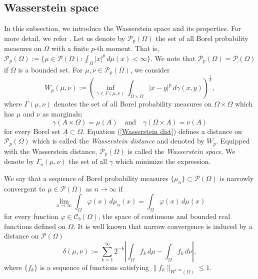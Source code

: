 \documentclass{amsart}
\numberwithin{equation}{section}
\newcommand{\calC}{{ \mathcal C  }}
\begin{document}
\subsection{Wasserstein space}\label{SS:Wasserstein}
In this subsection, we introduce the Wasserstein space and its properties. For more detail, we refer \cite{ags:book, Santambrosio15, V}.
 Let us denote by $\mathcal{P}_p (\Omega)$ the set of all Borel probability measures on $\Omega$ with a finite $p$-th moment. That is,
 $\mathcal{P}_p (\Omega):= \{\mu \in \mathcal{P} (\Omega) : \int_\Omega |x|^p \,d \mu(x) < \infty \}$.
 We note that $\mathcal{P}_p (\Omega)=\mathcal{P} (\Omega)$ if $\Omega$ is a bounded set.
For $\mu,\nu\in\mathcal{P}_p (\Omega)$, we consider
\begin{equation}\label{Wasserstein dist}
W_p(\mu,\nu):=\left(\inf_{\gamma\in\Gamma(\mu,\nu)}\int_{\Omega\times \Omega}|x-y|^p\, d\gamma(x,y)\right)^{\frac{1}{p}},
\end{equation}
where $\Gamma(\mu,\nu)$ denotes the set of all Borel probability measures on $\Omega\times \Omega$ which has $\mu$ and
$\nu$ as marginals;
$$\gamma(A\times \Omega)= \mu(A) \quad \text{and} \quad \gamma(\Omega\times A)= \nu(A) $$
for every Borel set $A\subset \Omega.$
Equation (\ref{Wasserstein dist}) defines a distance on $\mathcal{P}_p (\Omega)$ which is called the {\it Wasserstein distance} and denoted by $W_p$.
 Equipped with the Wasserstein distance,  $\mathcal{P}_p (\Omega)$ is called the {\it Wasserstein space}.
We denote by $\Gamma_o(\mu,\nu)$ the set of all $\gamma$ which minimize the expression.

We say that a sequence of Borel probability measures $\{\mu_n\} \subset \mathcal{P}(\Omega)$ is narrowly convergent to $ \mu \in \mathcal{P}(\Omega)$ as
$n \rightarrow \infty$ if
\begin{equation*}\label{D:narrowly convergent}
\lim_{n\rightarrow \infty} \int_{\Omega} \varphi(x) \,d\mu_n(x) =\int_{\Omega} \varphi(x) \,d\mu(x)
\end{equation*}
for every function $ \varphi \in \calC_b (\Omega)$, the space of continuous and bounded real functions defined on $\Omega$. It is well known
 that narrow convergence is induced by a distance on $\mathcal{P}(\Omega)$ %
 \begin{equation}\label{Narrow-distance}
 \delta(\mu, \nu):= \sum_{k=1}^\infty 2^{-k} \left | \int_\Omega f_k \, d\mu -\int_\Omega f_k \, d\nu \right |,
  \end{equation}
where $\{ f_k \}$ is a sequence of functions satisfying $\|f_k \|_{W^{1,\infty}(\Omega)} \leq 1$.  
\end{document}
